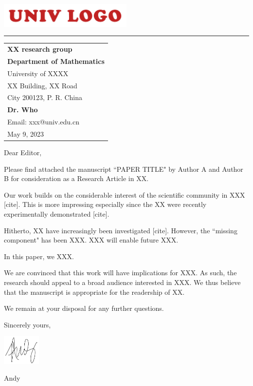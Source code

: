 \documentclass[11pt]{article}
\begin{document}

\includegraphics[width=0.5\textwidth]{UnivLogo.png} %

\vspace{-1em}

\rule{\linewidth}{0.5pt} %

\vspace{1.5em}


\hfill
\begin{tabular}{l @{}}
  \textbf{XX research group} \\
  \textbf{Department of Mathematics} \\
  University of XXXX \\
  XX Building, XX Road \\
	City 200123, P. R. China \\[1em] %
  \textbf{Dr. Who} \\
	Email: xxx@univ.edu.cn \\[1em]
  May 9, 2023 \\ %
\end{tabular}

\vspace{2em}

Dear Editor,

\bigskip


Please find attached the manuscript ``PAPER TITLE" by Author A and Author B for consideration as a Research Article in XX.

Our work builds on the considerable interest of the scientific community in XXX [cite]. This  is more impressing especially since the XX were recently experimentally demonstrated [cite].

Hitherto, XX have increasingly been investigated [cite]. However, the ``missing component" has  been XXX. XXX will enable future XXX.

In this paper, we XXX.

We are convinced that this work will have implications for XXX. As such, the research should  appeal to a broad audience interested in XXX. We thus believe that the manuscript is  appropriate for the readership of XX.

We remain at your disposal for any further questions.

\bigskip

Sincerely yours,

\includegraphics[height=1.5cm]{signature}


Andy
\end{document}
